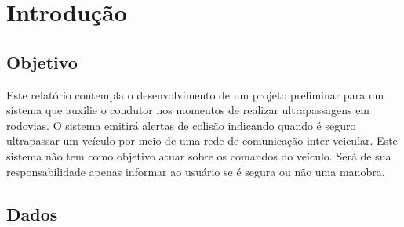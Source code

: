 \chapter[Introdução]{Introdução}

\section{Objetivo}
Este relatório contempla o desenvolvimento de um projeto preliminar para um sistema que auxilie o condutor nos momentos de
realizar ultrapassagens em rodovias. O sistema emitirá alertas de colisão indicando quando é seguro ultrapassar um veículo
por meio de uma rede de comunicação inter-veicular. Este sistema não tem como objetivo atuar sobre os comandos do veículo.
Será de sua responsabilidade apenas informar ao usuário se é segura ou não uma manobra.

\section{Dados}

